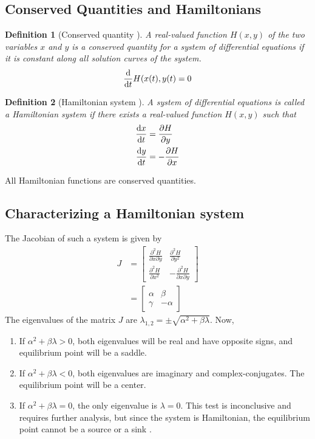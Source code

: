 \documentclass[12pt,1in]{article}
\newtheorem{definition}{Definition}
\begin{document}
\subsection{Conserved Quantities and Hamiltonians}
\begin{definition}[Conserved quantity \cite{diff_eq}]
A real-valued function $H(x,y)$ of the two variables $x$ and $y$ is a conserved quantity for a system of differential equations if it is constant along all solution curves of the system. 
\begin{align}
\derivative{}{t}H(x(t), y(t) = 0
\end{align}
\end{definition}
\newpage
\begin{definition}[Hamiltonian system \cite{diff_eq}]
A system of differential equations is called a \textit{Hamiltonian system} if there exists a real-valued function $H(x,y)$ such that 
\begin{align}
\derivative{x}{t} &= \frac{\partial H}{\partial y} \label{ham_1} \\
\derivative{y}{t} &= - \frac{\partial H}{\partial x} \label{ham_2}
\end{align}
\end{definition}
All Hamiltonian functions are conserved quantities.
\subsection{Characterizing a Hamiltonian system}
The Jacobian of such a system is given by 
\begin{align}
J &= \begin{bmatrix}
\frac{\partial^2H}{\partial x \partial y} & \frac{\partial^2H}{\partial y^2} \\
\frac{\partial^2H}{\partial x^2} & -\frac{\partial^2H}{\partial x \partial y}
\end{bmatrix} \\
&= \begin{bmatrix}
\alpha & \beta \\
\gamma & -\alpha
\end{bmatrix}
\end{align}
The eigenvalues of the matrix $J$ are $\lambda_{1,2} = \pm \sqrt{\alpha^2 + \beta\lambda}$. Now,
\begin{enumerate}
	\item If $\alpha^2 + \beta\lambda > 0$, both eigenvalues will be real and have opposite signs, and equilibrium point will be a saddle. 
	\item If $\alpha^2 + \beta\lambda < 0$, both eigenvalues are imaginary and complex-conjugates. The equilibrium  point will be a center. 
	\item If $\alpha^2 + \beta\lambda = 0$, the only eigenvalue is $\lambda = 0$. This test is inconclusive and requires further analysis, but since the system is Hamiltonian, the equilibrium point cannot be a source or a sink \cite{diff_eq}.  
\end{enumerate}
\end{document}
